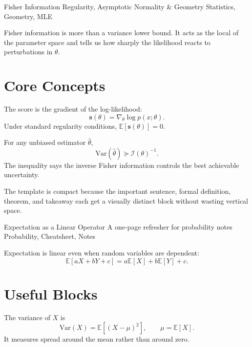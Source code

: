 \documentclass[12pt]{article}
\begin{document}
\MakeShortHeader
  {Fisher Information}
  {Regularity, Asymptotic Normality \& Geometry}
  {Statistics, Geometry, MLE}

\begin{KeyBox}
Fisher information is more than a variance lower bound. It acts as the local  of the parameter space and tells us how sharply the likelihood reacts to perturbations in $\theta$.
\end{KeyBox}

\section{Core Concepts}

\begin{Definition}
The score is the gradient of the log-likelihood:
\[
\mathbf{s}(\theta)=\nabla_{\theta}\log p(x;\theta).
\]
Under standard regularity conditions, $\mathbb{E}[\mathbf{s}(\theta)]=0$.
\end{Definition}

\begin{Theorem}
For any unbiased estimator $\hat{\theta}$,
\[
\mathrm{Var}(\hat{\theta})\succeq \mathcal{I}(\theta)^{-1}.
\]
The inequality says the inverse Fisher information controls the best achievable uncertainty.
\end{Theorem}

\begin{Takeaway}
The template is compact because the important sentence, formal definition, theorem, and takeaway each get a visually distinct block without wasting vertical space.
\end{Takeaway}

\newpage

\MakeShortHeader
  {Expectation as a Linear Operator}
  {A one-page refresher for probability notes}
  {Probability, Cheatsheet, Notes}

\begin{KeyBox}
Expectation is linear even when random variables are dependent:
\[
\mathbb{E}[aX+bY+c]=a\mathbb{E}[X]+b\mathbb{E}[Y]+c.
\]
\end{KeyBox}

\section{Useful Blocks}

\begin{Definition}[Variance]
The variance of $X$ is
\[
\mathrm{Var}(X)=\mathbb{E}\left[(X-\mu)^2\right],\qquad \mu=\mathbb{E}[X].
\]
It measures spread around the mean rather than around zero.
\end{Definition}
\end{document}
